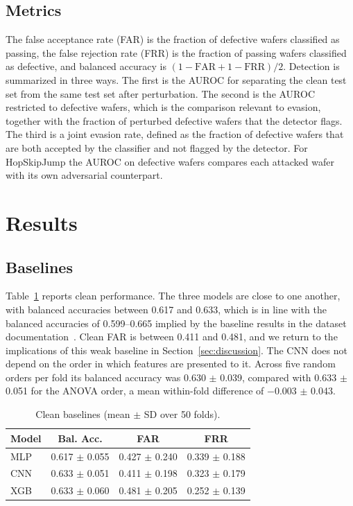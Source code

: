 \documentclass[preprint,12pt,authoryear]{elsarticle}
\begin{document}
\subsection{Metrics}
The false acceptance rate (FAR) is the fraction of defective wafers classified as passing, the false rejection rate (FRR) is the fraction of passing wafers classified as defective, and balanced accuracy is $(1-\text{FAR}+1-\text{FRR})/2$. Detection is summarized in three ways. The first is the AUROC for separating the clean test set from the same test set after perturbation. The second is the AUROC restricted to defective wafers, which is the comparison relevant to evasion, together with the fraction of perturbed defective wafers that the detector flags. The third is a joint evasion rate, defined as the fraction of defective wafers that are both accepted by the classifier and not flagged by the detector. For HopSkipJump the AUROC on defective wafers compares each attacked wafer with its own adversarial counterpart.

\section{Results}
\label{sec:results}

\subsection{Baselines}
Table~\ref{tab:baselines} reports clean performance. The three models are close to one another, with balanced accuracies between 0.617 and 0.633, which is in line with the balanced accuracies of 0.599--0.665 implied by the baseline results in the dataset documentation~\citep{secom2008}. Clean FAR is between 0.411 and 0.481, and we return to the implications of this weak baseline in Section~\ref{sec:discussion}. The CNN does not depend on the order in which features are presented to it. Across five random orders per fold its balanced accuracy was 0.630 $\pm$ 0.039, compared with 0.633 $\pm$ 0.051 for the ANOVA order, a mean within-fold difference of $-$0.003 $\pm$ 0.043.

\begin{table}[!htbp]
\centering
\caption{Clean baselines (mean $\pm$ SD over 50 folds).}
\label{tab:baselines}
\begin{tabular}{lccc}
\toprule
Model & Bal. Acc. & FAR & FRR \\
\midrule
MLP & 0.617 $\pm$ 0.055 & 0.427 $\pm$ 0.240 & 0.339 $\pm$ 0.188 \\
CNN & 0.633 $\pm$ 0.051 & 0.411 $\pm$ 0.198 & 0.323 $\pm$ 0.179 \\
XGB & 0.633 $\pm$ 0.060 & 0.481 $\pm$ 0.205 & 0.252 $\pm$ 0.139 \\
\bottomrule
\end{tabular}
\end{table}
\end{document}
